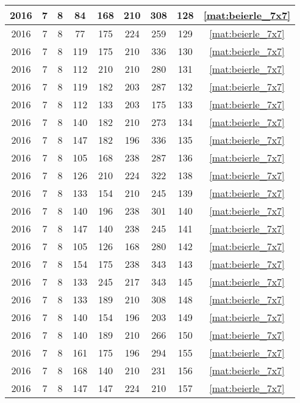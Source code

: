 \begin{longtable}{|c|c|c|c|c|c|c|c|c|}
2016 & 7 & 8 & 84 & 168 & 210 & 308 & 128 & \eqref{mat:beierle_7x7} \\ \hline 
2016 & 7 & 8 & 77 & 175 & 224 & 259 & 129 & \eqref{mat:beierle_7x7} \\ \hline 
2016 & 7 & 8 & 119 & 175 & 210 & 336 & 130 & \eqref{mat:beierle_7x7} \\ \hline 
2016 & 7 & 8 & 112 & 210 & 210 & 280 & 131 & \eqref{mat:beierle_7x7} \\ \hline 
2016 & 7 & 8 & 119 & 182 & 203 & 287 & 132 & \eqref{mat:beierle_7x7} \\ \hline 
2016 & 7 & 8 & 112 & 133 & 203 & 175 & 133 & \eqref{mat:beierle_7x7} \\ \hline 
2016 & 7 & 8 & 140 & 182 & 210 & 273 & 134 & \eqref{mat:beierle_7x7} \\ \hline 
2016 & 7 & 8 & 147 & 182 & 196 & 336 & 135 & \eqref{mat:beierle_7x7} \\ \hline 
2016 & 7 & 8 & 105 & 168 & 238 & 287 & 136 & \eqref{mat:beierle_7x7} \\ \hline 
2016 & 7 & 8 & 126 & 210 & 224 & 322 & 138 & \eqref{mat:beierle_7x7} \\ \hline 
2016 & 7 & 8 & 133 & 154 & 210 & 245 & 139 & \eqref{mat:beierle_7x7} \\ \hline 
2016 & 7 & 8 & 140 & 196 & 238 & 301 & 140 & \eqref{mat:beierle_7x7} \\ \hline 
2016 & 7 & 8 & 147 & 140 & 238 & 245 & 141 & \eqref{mat:beierle_7x7} \\ \hline 
2016 & 7 & 8 & 105 & 126 & 168 & 280 & 142 & \eqref{mat:beierle_7x7} \\ \hline 
2016 & 7 & 8 & 154 & 175 & 238 & 343 & 143 & \eqref{mat:beierle_7x7} \\ \hline 
2016 & 7 & 8 & 133 & 245 & 217 & 343 & 145 & \eqref{mat:beierle_7x7} \\ \hline 
2016 & 7 & 8 & 133 & 189 & 210 & 308 & 148 & \eqref{mat:beierle_7x7} \\ \hline 
2016 & 7 & 8 & 140 & 154 & 196 & 203 & 149 & \eqref{mat:beierle_7x7} \\ \hline 
2016 & 7 & 8 & 140 & 189 & 210 & 266 & 150 & \eqref{mat:beierle_7x7} \\ \hline 
2016 & 7 & 8 & 161 & 175 & 196 & 294 & 155 & \eqref{mat:beierle_7x7} \\ \hline 
2016 & 7 & 8 & 168 & 140 & 210 & 231 & 156 & \eqref{mat:beierle_7x7} \\ \hline 
2016 & 7 & 8 & 147 & 147 & 224 & 210 & 157 & \eqref{mat:beierle_7x7} \\ \hline 

\end{longtable}
